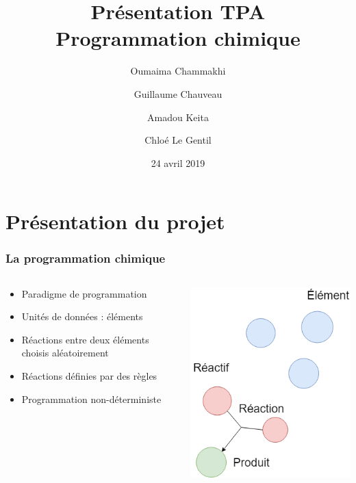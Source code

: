 \documentclass{beamer}
\title{Présentation TPA \\ Programmation chimique}
\author{Oumaima Chammakhi \and Guillaume Chauveau \and Amadou Keita \and Chloé Le Gentil}
\institute{Université Caen Normandie}
\date{24 avril 2019}
\begin{document}
\begin{frame}
\titlepage
\end{frame}

\section{Présentation du projet}

\begin{frame}
\frametitle{La programmation chimique}
\begin{columns}

\begin{column}{7cm}
\begin{itemize}
    \item Paradigme de programmation
    \item Unités de données : éléments
    \item Réactions entre deux éléments choisis aléatoirement
    \item Réactions définies par des règles
    \item Programmation non-déterministe
\end{itemize}
\end{column}

\begin{column}{5cm}
\begin{center}
\includegraphics[scale=0.3]{img/Programme.png}
\end{center}
\end{column}

\end{columns}
\end{frame}
\end{document}
